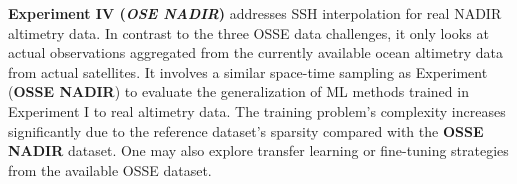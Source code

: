 \textbf{Experiment IV (\textit{OSE NADIR})} addresses SSH interpolation for real NADIR altimetry data. 
In contrast to the three OSSE data challenges, it only looks at actual observations aggregated from the currently available ocean altimetry data from actual satellites. 
It involves a similar space-time sampling as Experiment (\textbf{OSSE NADIR}) to evaluate the generalization of ML methods trained in Experiment I to real altimetry data. 
The training problem's complexity increases significantly due to the reference dataset's sparsity compared with the \textbf{OSSE NADIR} dataset. 
One may also explore transfer learning or fine-tuning strategies from the available OSSE dataset. 






